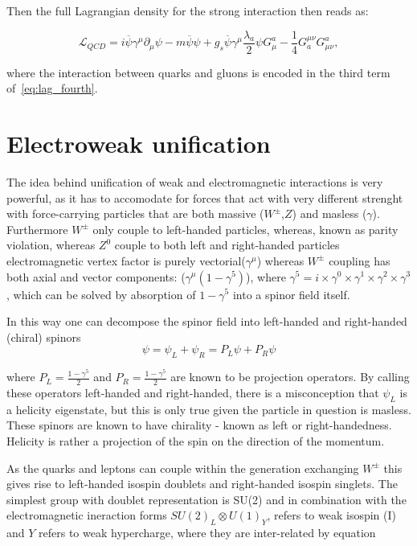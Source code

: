 Then the full Lagrangian density for the strong interaction then reads as:

\begin{equation}
	\mathcal{L}_{QCD} = i\overline{\psi}\gamma^{\mu}\partial_{\mu}\psi - m\overline{\psi}\psi + g_{s}\overline{\psi}\gamma^{\mu}\frac{\lambda_{a}}{2}\psi G^{a}_{\mu} -\frac{1}{4} G_{a}^{\mu\nu}G^{a}_{\mu\nu},
\label{eq:lag_fourth}
\end{equation}

where the interaction between quarks and gluons is encoded in the third term of~\autoref{eq:lag_fourth}.


\section{Electroweak unification}
The idea behind unification of weak and electromagnetic interactions is very powerful, as it has to accomodate for forces that act with very different strenght with force-carrying particles that are both massive ($W^{\pm}$,$Z$) and masless ($\gamma$). Furthermore $W^{\pm}$ only couple to left-handed particles, whereas, known as parity violation, whereas $Z^{0}$ couple to both left and right-handed particles  electromagnetic vertex factor is purely vectorial($\gamma^{\mu}$) whereas $W^{\pm}$ coupling has both axial and vector components: ($\gamma^{\mu}(1-\gamma^{5})$), where $\gamma^{5}=i\times\gamma^{0}\times\gamma^{1}\times\gamma^{2}\times\gamma^{3}$, which can be solved by absorption of $1-\gamma^{5}$ into a spinor field itself.

In this way one can decompose the spinor field into left-handed and right-handed (chiral) spinors
\begin{equation}
	\psi=\psi_{L}+\psi_{R} = P_{L}\psi + P_{R}\psi
\end{equation}

where $P_{L} =\frac{1-\gamma^{5}}{2}$ and $P_{R}=\frac{1-\gamma^{5}}{2}$ are known to be projection operators. By calling these operators left-handed and right-handed, there is a misconception that $\psi_{L}$ is a helicity eigenstate, but this is only true given the particle in question is masless. These spinors are known to have chirality - known as left or right-handedness. Helicity is rather a projection of the spin on the direction of the momentum.

As the quarks and leptons can couple within the generation exchanging $W^{\pm}$ this gives rise to left-handed isospin doublets and right-handed isospin singlets. The simplest group with doublet representation is SU(2) and in combination with the electromagnetic ineraction forms $SU(2)_{L} \otimes U(1)_{Y}$, refers to weak isospin (I) and $Y$ refers to weak hypercharge, where they are inter-related by equation

